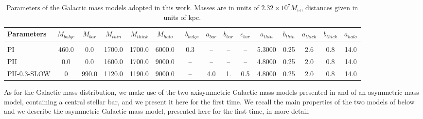     \begin{table}
        \centering
        \caption[Parameters of the Galactic mass models adopted in this work.]{Parameters of the Galactic mass models adopted in this work. Masses are in units of $2.32\times10^7M_{\odot}$, distances given in units of kpc.
        \label{PII}}
        \tiny
        \begin{tabular}{  l c  c  c  c  c  c  c  c  c  c  c  c  c   c } \hline
        Parameters & $M_{bulge}$ &  $M_{bar}$ & $M_{thin}$ &  $M_{thick}$  & $M_{halo}$ & \ $b_{bulge}$  & $a_{bar}$ & $b_{bar}$ & $c_{bar}$ & $a_{thin}$ & $b_{thin}$  & $a_{thick}$ &  $b_{thick}$ & $a_{halo}$ \\  \hline \hline \\
        PI & 460.0 & 0.0 & 1700.0 & 1700.0  & 6000.0  & 0.3 & -- & -- & -- & 5.3000 & 0.25 & 2.6 & 0.8 & 14.0 \\  \hline    
            PII & 0.0 & 0.0 & 1600.0 & 1700.0  & 9000.0  & -- & -- & -- & -- & 4.8000 & 0.25 & 2.0 &  0.8 & 14.0 \\    \hline    
            PII-0.3-SLOW & 0 & 990.0 & 1120.0 & 1190.0  & 9000.0  & -- & 4.0 & 1. & 0.5 & 4.8000 &0.25 & 2.0 &  0.8 & 14.0 \\ \hline 
        \end{tabular} 
        \normalsize
    \end{table}    

    As for the Galactic mass distribution, we make use of the two axisymmetric Galactic mass models presented in \citet{2017A&A...598A..66P} and of an asymmetric mass model, containing a central stellar bar, and we present it here for the first time. We recall  the main properties of the two models of  \citet{2017A&A...598A..66P} below and we describe the asymmetric Galactic mass model, presented here for the first time, in more detail.

